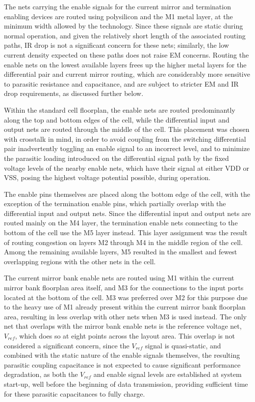 The nets carrying the enable signals for the current mirror and termination enabling devices are routed using polysilicon and the M1 metal layer, at the minimum width allowed by the technology. Since these signals are static during normal operation, and given the relatively short length of the associated routing paths, IR drop is not a significant concern for these nets; similarly, the low current density expected on these paths does not raise \ac{EM} concerns. Routing the enable nets on the lowest available layers frees up the higher metal layers for the differential pair and current mirror routing, which are considerably more sensitive to parasitic resistance and capacitance, and are subject to stricter \ac{EM} and IR drop requirements, as discussed further below.

Within the standard cell floorplan, the enable nets are routed predominantly along the top and bottom edges of the cell, while the differential input and output nets are routed through the middle of the cell. This placement was chosen with crosstalk in mind, in order to avoid coupling from the switching differential pair inadvertently toggling an enable signal to an incorrect level, and to minimize the parasitic loading introduced on the differential signal path by the fixed voltage levels of the nearby enable nets, which have their signal at either VDD or VSS, posing the highest voltage potential possible, during operation.

The enable pins themselves are placed along the bottom edge of the cell, with the exception of the termination enable pins, which partially overlap with the differential input and output nets. Since the differential input and output nets are routed mainly on the \ac{M4} layer, the termination enable nets connecting to the bottom of the cell use the \ac{M5} layer instead. This layer assignment was the result of routing congestion on layers M2 through \ac{M4} in the middle region of the cell. Among the remaining available layers, \ac{M5} resulted in the smallest and fewest overlapping regions with the other nets in the cell.

The current mirror bank enable nets are routed using M1 within the current mirror bank floorplan area itself, and \ac{M3} for the connections to the input ports located at the bottom of the cell. \ac{M3} was preferred over M2 for this purpose due to the heavy use of M1 already present within the current mirror bank floorplan area, resulting in less overlap with other nets when \ac{M3} is used instead. The only net that overlaps with the mirror bank enable nets is the reference voltage net, $V_{ref}$, which does so at eight points across the layout area. This overlap is not considered a significant concern, since the $V_{ref}$ signal is quasi-static, and combined with the static nature of the enable signals themselves, the resulting parasitic coupling capacitance is not expected to cause significant performance degradation, as both the $V_{ref}$ and enable signal levels are established at system start-up, well before the beginning of data transmission, providing sufficient time for these parasitic capacitances to fully charge.

